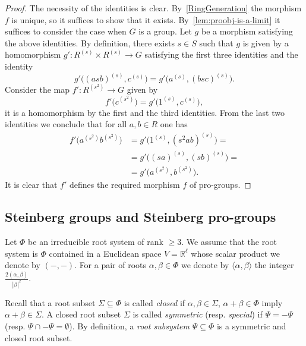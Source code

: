 \documentclass{article}
\numberwithin{equation}{section}
\theoremstyle{definition}
\theoremstyle{remark}
\begin{document}
\begin{proof}
The necessity of the identities is clear.
By~\cref{RingGeneration} the morphism \(f\) is unique, so it suffices to show that it exists.
By~\cref{lem:proobj-is-a-limit} it suffices to consider the case when \(G\) is a group. 
Let \(g\) be a morphism satisfying the above identities.
By definition, there exists $s\in S$ such that $g$ is given by a homomorphism \(g' \colon R^{(s)} \times R^{(s)} \to G\) satisfying the first three identities and the identity 
\[g'\bigl((asb)^{(s)}, c^{(s)}\bigr) = g'\bigl(a^{(s)}, (bsc)^{(s)}\bigr).\]
Consider the map \(f' \colon R^{(s^2)} \to G\) given by
\[f'\bigl(c^{(s^2)}\bigr) = g'\bigl(1^{(s)}, c^{(s)}\bigr),\]
it is a homomorphism by the first and the third identities.
From the last two identities we conclude that for all \(a, b \in R\) one has
\begin{align*}
f'\bigl(a^{(s^2)} b^{(s^2)})
&= g' \bigl( 1^{(s)}, (s^2 ab)^{(s)} \bigr) =\\
&= g' \bigl( (sa)^{(s)}, (sb)^{(s)} \bigr) =\\
&= g' \bigl(a^{(s^2)}, b^{(s^2)}\bigr).
\end{align*}
It is clear that \(f'\) defines the required morphism \(f\) of pro-groups.
\end{proof}

\subsection{Steinberg groups and Steinberg pro-groups}
Let $\Phi$ be an irreducible root system of rank $\geq 3$.
We assume that the root system is $\Phi$ contained in a Euclidean space $V = \mathbb{R}^\ell$ whose scalar product we denote by $(-, -)$.
For a pair of roots $\alpha, \beta \in \Phi$ we denote by $\langle \alpha, \beta \rangle$ the integer $\tfrac{2(\alpha, \beta)}{|\beta|^2}$.

Recall that a root subset $\Sigma \subseteq \Phi$ is called {\it closed} if $\alpha, \beta \in \Sigma$, $\alpha+\beta\in\Phi$ imply $\alpha+\beta\in \Sigma$. A closed root subset $\Sigma$ is called {\it symmetric} (resp. {\it special}) if $\Psi = -\Psi$ (resp. $\Psi \cap -\Psi = \emptyset$). By definition, a {\it root subsystem} $\Psi \subseteq \Phi$ is a symmetric and closed root subset.
\end{document}
